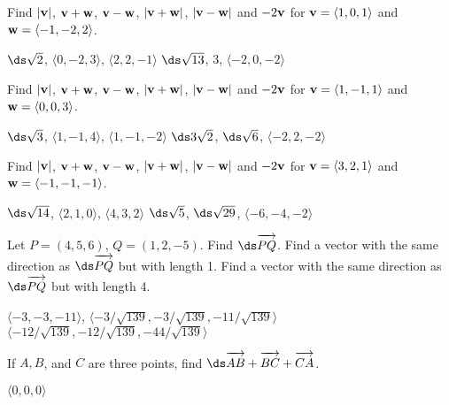 \begin{enumialphparenastyle}
\begin{ex}
Find $|{\bf v}|$, ${\bf v}+{\bf w}$, ${\bf v}-{\bf w}$,
$|{\bf v}+{\bf w}|$, $|{\bf v}-{\bf w}|$ and $-2{\bf v}$ for
${\bf v} = \langle 1,0,1\rangle$ and ${\bf w} = \langle -1,-2,2 \rangle$.
\begin{sol}
$\ds \sqrt{2}$, $\langle 0,-2,3\rangle$, $\langle 2,2,-1\rangle$
$\ds \sqrt{13}$, $3$, $\langle -2, 0, -2\rangle$
\end{sol}
\end{ex}

\begin{ex}
Find $|{\bf v}|$, ${\bf v}+{\bf w}$, ${\bf v}-{\bf w}$,
$|{\bf v}+{\bf w}|$, $|{\bf v}-{\bf w}|$ and $-2{\bf v}$ for
${\bf v} = \langle 1,-1,1\rangle$ and ${\bf w} = \langle 0,0,3\rangle$.
\begin{sol}
$\ds \sqrt{3}$, $\langle 1,-1,4\rangle$, $\langle 1,-1,-2\rangle$
$\ds 3\sqrt{2}$, $\ds \sqrt{6}$, $\langle -2, 2, -2\rangle$
\end{sol}
\end{ex}

\begin{ex}
Find $|{\bf v}|$, ${\bf v}+{\bf w}$, ${\bf v}-{\bf w}$,
$|{\bf v}+{\bf w}|$, $|{\bf v}-{\bf w}|$ and $-2{\bf v}$ for
${\bf v} = \langle 3,2,1\rangle$ and ${\bf w} = \langle -1,-1,-1\rangle$.
\begin{sol}
$\ds \sqrt{14}$, $\langle 2,1,0\rangle$, $\langle 4,3,2\rangle$
$\ds \sqrt{5}$, $\ds \sqrt{29}$, $\langle -6,-4, -2\rangle$
\end{sol}
\end{ex}

\begin{ex}
Let $P=(4,5,6)$, $Q=(1,2,-5)$. Find 
$\ds \overrightarrow{\strut PQ}$. Find a vector with
the same direction as $\ds \overrightarrow{\strut PQ}$
but with length 1. Find a vector with
the same direction as $\ds \overrightarrow{\strut PQ}$
but with length 4.
\begin{sol}
$\langle -3, -3, -11\rangle$,
$\langle -3/\sqrt{139},-3/\sqrt{139},-11/\sqrt{139}\rangle$
$\langle -12/\sqrt{139},-12/\sqrt{139},-44/\sqrt{139}\rangle$
\end{sol}
\end{ex}

\begin{ex}
If $A, B$, and $C$ are three points, find
$\ds \overrightarrow{\strut AB}+
\overrightarrow{\strut BC}+
\overrightarrow{\strut CA}$.
\begin{sol}
$\langle 0,0,0\rangle$
\end{sol}
\end{ex}


\end{enumialphparenastyle}
